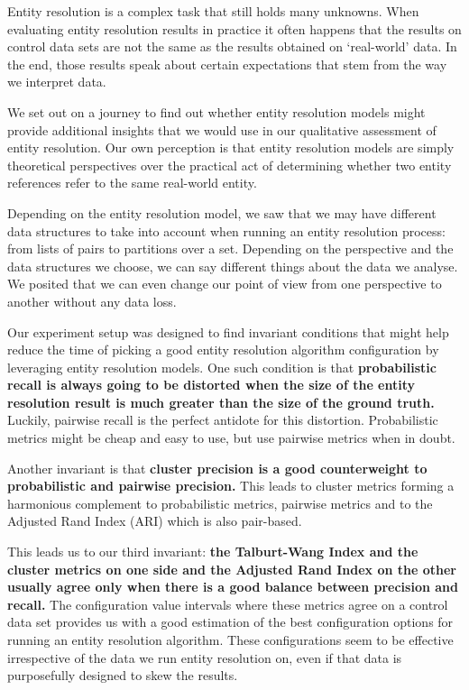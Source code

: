 \documentclass[journal]{IEEEtran}
\begin{document}
    Entity resolution is a complex task that still holds many unknowns.
    When evaluating entity resolution results in practice it often happens that
    the results on control data sets are not the same as the results obtained
    on `real-world' data.
    In the end, those results speak about certain expectations that stem from
    the way we interpret data.

    We set out on a journey to find out whether entity resolution models might
    provide additional insights that we would use in our qualitative assessment
    of entity resolution.
    Our own perception is that entity resolution models are simply theoretical
    perspectives over the practical act of determining whether two entity
    references refer to the same real-world entity.

    Depending on the entity resolution model, we saw that we may have different
    data structures to take into account when running an entity resolution
    process: from lists of pairs to partitions over a set.
    Depending on the perspective and the data structures we choose, we can say
    different things about the data we analyse.
    We posited that we can even change our point of view from one perspective to
    another without any data loss.

    Our experiment setup was designed to find invariant conditions that might
    help reduce the time of picking a good entity resolution algorithm
    configuration by leveraging entity resolution models.
    One such condition is that \textbf{probabilistic recall is always going to
    be distorted when the size of the entity resolution result is much greater
    than the size of the ground truth.}
    Luckily, pairwise recall is the perfect antidote for this distortion.
    Probabilistic metrics might be cheap and easy to use, but use pairwise
    metrics when in doubt.

    Another invariant is that \textbf{cluster precision is a good counterweight
    to probabilistic and pairwise precision.}
    This leads to cluster metrics forming a harmonious complement to
    probabilistic metrics, pairwise metrics and to the Adjusted Rand Index (ARI)
    which is also pair-based.
    
    This leads us to our third invariant: \textbf{the Talburt-Wang Index and the
    cluster metrics on one side and the Adjusted Rand Index on the other usually
    agree only when there is a good balance between precision and recall.}
    The configuration value intervals where these metrics agree on a control
    data set provides us with a good estimation of the best configuration
    options for running an entity resolution algorithm.
    These configurations seem to be effective irrespective of the data we run
    entity resolution on, even if that data is purposefully designed to skew the
    results.
\end{document}
